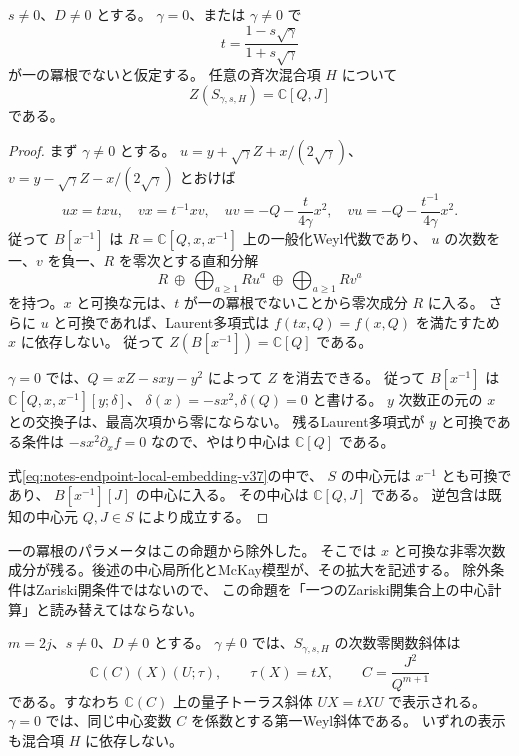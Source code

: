 \begin{proposition}[非共鳴パラメータでの中心]
$s\ne0$、$D\ne0$ とする。
$\gamma=0$、または
$\gamma\ne0$ で
\[
 t=\frac{1-s\sqrt\gamma}{1+s\sqrt\gamma}
\]
が一の冪根でないと仮定する。
任意の斉次混合項 $H$ について
\[
 Z(S_{\gamma,s,H})=\mathbb C[Q,J]
\]
である。
\end{proposition}

\begin{proof}
まず $\gamma\ne0$ とする。
$u=y+\sqrt\gamma Z+x/(2\sqrt\gamma)$、
$v=y-\sqrt\gamma Z-x/(2\sqrt\gamma)$ とおけば
\[
 ux=txu,\quad vx=t^{-1}xv,\quad
 uv=-Q-\frac{t}{4\gamma}x^2,\quad
 vu=-Q-\frac{t^{-1}}{4\gamma}x^2.
\]
従って $B[x^{-1}]$ は
$R=\mathbb C[Q,x,x^{-1}]$ 上の一般化Weyl代数であり、
$u$ の次数を一、$v$ を負一、$R$ を零次とする直和分解
\[
 R\ \oplus\ \bigoplus_{a\ge1}Ru^a\
   \oplus\ \bigoplus_{a\ge1}Rv^a
\]
を持つ。$x$ と可換な元は、$t$ が一の冪根でないことから零次成分 $R$ に入る。
さらに $u$ と可換であれば、Laurent多項式は
$f(tx,Q)=f(x,Q)$ を満たすため $x$ に依存しない。
従って $Z(B[x^{-1}])=\mathbb C[Q]$ である。

$\gamma=0$ では、$Q=xZ-sxy-y^2$ によって $Z$ を消去できる。
従って $B[x^{-1}]$ は
$\mathbb C[Q,x,x^{-1}][y;\delta]$、
$\delta(x)=-sx^2,\delta(Q)=0$ と書ける。
$y$ 次数正の元の $x$ との交換子は、最高次項から零にならない。
残るLaurent多項式が $y$ と可換である条件は
$-sx^2\partial_x f=0$ なので、やはり中心は $\mathbb C[Q]$ である。

式\eqref{eq:notes-endpoint-local-embedding-v37}の中で、
$S$ の中心元は $x^{-1}$ とも可換であり、
$B[x^{-1}][J]$ の中心に入る。
その中心は $\mathbb C[Q,J]$ である。
逆包含は既知の中心元 $Q,J\in S$ により成立する。
\end{proof}

一の冪根のパラメータはこの命題から除外した。
そこでは $x$ と可換な非零次数成分が残る。後述の中心局所化とMcKay模型が、その拡大を記述する。
除外条件はZariski開条件ではないので、
この命題を「一つのZariski開集合上の中心計算」と読み替えてはならない。

\begin{proposition}[次数零関数斜体の明示表示]
$m=2j$、$s\ne0$、$D\ne0$ とする。
$\gamma\ne0$ では、$S_{\gamma,s,H}$ の次数零関数斜体は
\[
 \mathbb C(C)(X)(U;\tau),\qquad \tau(X)=tX,\qquad
 C=\frac{J^2}{Q^{m+1}}
\]
である。すなわち $\mathbb C(C)$ 上の量子トーラス斜体
$UX=tXU$ で表示される。
$\gamma=0$ では、同じ中心変数 $C$ を係数とする第一Weyl斜体である。
いずれの表示も混合項 $H$ に依存しない。
\end{proposition}

